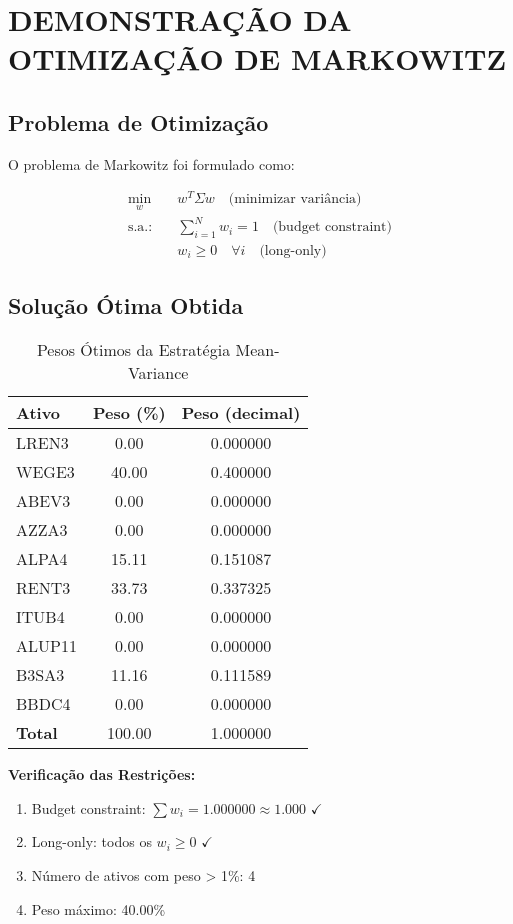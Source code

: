 \section{DEMONSTRAÇÃO DA OTIMIZAÇÃO DE MARKOWITZ}

\subsection{Problema de Otimização}

O problema de Markowitz foi formulado como:

\begin{align}
\min_{w} \quad & w^T \Sigma w \quad \text{(minimizar variância)} \\
\text{s.a.:} \quad & \sum_{i=1}^{N} w_i = 1 \quad \text{(budget constraint)} \\
& w_i \geq 0 \quad \forall i \quad \text{(long-only)}
\end{align}

\subsection{Solução Ótima Obtida}

\begin{table}[H]
\centering
\caption{Pesos Ótimos da Estratégia Mean-Variance}
\begin{tabular}{|l|c|c|}
\hline
\textbf{Ativo} & \textbf{Peso (\%)} & \textbf{Peso (decimal)} \\
\hline
LREN3 & 0.00 & 0.000000 \\
WEGE3 & 40.00 & 0.400000 \\
ABEV3 & 0.00 & 0.000000 \\
AZZA3 & 0.00 & 0.000000 \\
ALPA4 & 15.11 & 0.151087 \\
RENT3 & 33.73 & 0.337325 \\
ITUB4 & 0.00 & 0.000000 \\
ALUP11 & 0.00 & 0.000000 \\
B3SA3 & 11.16 & 0.111589 \\
BBDC4 & 0.00 & 0.000000 \\
\hline
\textbf{Total} & 100.00 & 1.000000 \\
\hline
\end{tabular}
\end{table}

\textbf{Verificação das Restrições:}
\begin{enumerate}
    \item Budget constraint: $\sum w_i = 1.000000 \approx 1.000$ $\checkmark$
    \item Long-only: todos os $w_i \geq 0$ $\checkmark$
    \item Número de ativos com peso > 1\%: 4
    \item Peso máximo: 40.00\%
\end{enumerate}

